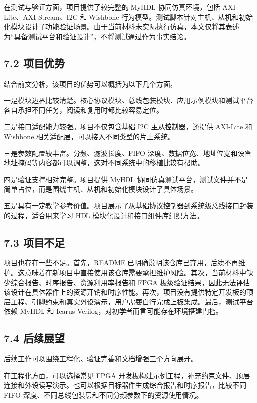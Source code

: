 在测试与验证方面，项目提供了较完整的 MyHDL 协同仿真环境，包括 AXI-Lite、AXI Stream、I2C 和 Wishbone 行为模型。测试脚本针对主机、从机和初始化模块设计了功能验证场景。由于当前材料未实际执行仿真，本文仅将其表述为``具备测试平台和验证设计''，不将测试通过作为事实结论。

\subsection{7.2 项目优势}\label{ux9879ux76eeux4f18ux52bf}

结合前文分析，该项目的优势可以概括为以下几个方面。

一是模块边界比较清楚。核心协议模块、总线包装模块、应用示例模块和测试平台各自承担不同任务，阅读和复用时都比较容易定位。

二是接口适配能力较强。项目不仅包含基础 I2C 主从控制器，还提供 AXI-Lite 和 Wishbone 相关适配层，可以接入不同类型的片上系统。

三是参数配置较丰富。分频、滤波长度、FIFO 深度、数据位宽、地址位宽和设备地址掩码等内容都可以调整，这对不同系统中的移植比较有帮助。

四是验证支撑相对完整。项目提供 MyHDL 协同仿真测试平台，测试文件并不是简单占位，而是围绕主机、从机和初始化模块设计了具体场景。

五是具有一定教学参考价值。项目展示了从基础协议控制器到系统级总线接口封装的过程，适合用来学习 HDL 模块化设计和接口组件库组织方法。

\subsection{7.3 项目不足}\label{ux9879ux76eeux4e0dux8db3}

项目也存在一些不足。首先，README 已明确说明该仓库已弃用，后续不再维护。这意味着在新项目中直接使用该仓库需要承担维护风险。其次，当前材料中缺少综合报告、时序报告、资源利用率报告和 FPGA 板级验证结果，因此无法评估该设计在具体器件上的资源开销和时序性能。再次，项目没有提供特定开发板的顶层工程、引脚约束和真实外设演示，用户需要自行完成上板集成。最后，测试平台依赖 MyHDL 和 Icarus Verilog，对初学者而言可能存在环境搭建门槛。

\subsection{7.4 后续展望}\label{ux540eux7eedux5c55ux671b}

后续工作可以围绕工程化、验证完善和文档增强三个方向展开。

在工程化方面，可以选择常见 FPGA 开发板构建示例工程，补充约束文件、顶层连接和外设读写演示。也可以根据目标器件生成综合报告和时序报告，比较不同 FIFO 深度、不同总线包装层和不同分频参数下的资源使用情况。

